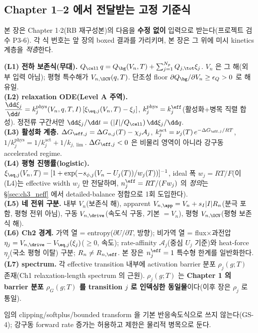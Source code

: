 \subsection{Chapter 1--2 에서 전달받는 고정 기준식}\label{sec:ch3_inherit}
본 장은 Chapter 1$\cdot$2(RB 재구성본)의 다음을 \textbf{수정 없이} 입력으로 받는다(프로젝트 검수 P3-6). 각 식
번호는 앞 장의 boxed 결과를 가리키며, 본 장은 그 위에 미시 kinetics 계층을 \emph{적층}한다.
\begin{linkbox}
\textbf{(L1) 전하 보존식(무대).} $Q_\cell\,q=Q_\bg(V_n,T)+\sum_{j=1}^{N_p}Q_{j,\tot}\xi_j$. $V_n$ 은 그 해(외부
입력 아님); 평형 특수해가 $V_{n,\OCV}(q,T)$. 단조성 floor $\partial Q_\bg/\partial V_n\ge\epsilon_Q>0$ 로 해 유일.\\
\textbf{(L2) relaxation ODE(Level A 주역).} $\dfrac{\dd\xi_j}{\dd t}=k_j^{\mathrm{phys}}(V_n,q,T,I)\,[\xi_{\eq,j}(V_n,T)-\xi_j]$,
$k_j^{\mathrm{phys}}=k_j^{\eff}$(활성화+병목 직렬 합성). 정전류 구간서만 $\dd\xi_j/\dd t=(|I|/Q_\cell)\,\dd\xi_j/\dd q$.\\
\textbf{(L3) 활성화 계층.} $\Delta G_{\eff,j}=\Delta G_{a,j}(T)-\chi_j\mathcal A_j$,
$k_j^{\mathrm{act}}=\nu_j(T)\,e^{-\Delta G_{\eff,j}/RT}$, $1/k_j^{\mathrm{phys}}=1/k_j^{\mathrm{act}}+1/k_{j,\lim}$.
$\Delta G_{\eff,j}<0$ 은 비물리 영역이 아니라 강구동 accelerated regime.\\
\textbf{(L4) 평형 진행률(logistic).} $\xi_{\eq,j}(V_n,T)=[1+\exp(-s_{\phi,j}(V_n-U_j(T))/w_j(T))]^{-1}$, ideal
폭 $w_j=RT/F$(이 (L4)는 effective width $w_j$ 만 전달하며, $n_j^{\eff}=RT/(Fw_j)$ 의 \emph{정의}는 \S\ref{sec:ch3_neff}
에서 detailed-balance 정합으로 1회 도입한다).\\
\textbf{(L5) 네 전위 구분.} 내부 $V_n$(보존식 해), apparent $V_{n,\app}=V_n+s_I|I|R_n$(분극 포함, 평형 전위
아님), 구동 $V_{n,\drive}$(속도식 구동, 기본 $=V_n$), 평형 $V_{n,\OCV}$(평형 보존식 해).\\
\textbf{(L6) Ch2 경계.} 가역 열 = entropy($\partial U/\partial T$, 방향); 비가역 열 = flux$\times$과전압
$\eta_j=V_{n,\drive}-V_{\eq,j}(\xi_j)$($\ge0$, 속도); rate-affinity $\mathcal A_j$(중심 $U_j$ 기준)와
heat-force $\eta_j$(국소 평형 이탈) 구분; $R_n\ne R_{n,\eff}$. 본 장은 $n_j^{\eff}=1$ 특수형 한계를 일반화한다.\\
\textbf{(L7) spectrum.} 각 effective transition 내부에 activation barrier 분포 $\rho_j(g;T)$ 존재(Ch1
relaxation-length spectrum 의 근원). $\rho_j(g;T)$ 는 \textbf{Chapter 1 의 barrier 분포 $\rho_G(g;T)$ 를
transition $j$ 로 인덱싱한 동일물}이다(이후 장은 $\rho_j$ 로 통일).
\end{linkbox}
임의 clipping/softplus/bounded transform 을 기본 반응속도식으로 쓰지 않는다(GS-4); 강구동 forward rate 증가는
허용하고 제한은 물리적 병목으로 둔다.

